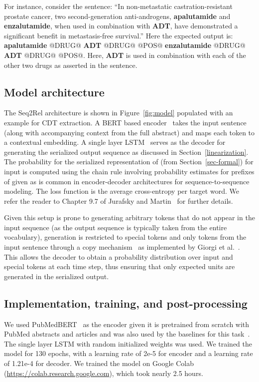 \documentclass[conference]{IEEEtran}
\begin{document}
For instance, consider the sentence: ``In non-metastatic castration-resistant prostate cancer, 
two second-generation anti-androgens, {\textbf{apalutamide} } and {\textbf{enzalutamide}}, when  
used in combination with {\textbf{ADT}}, have demonstrated a significant benefit in 
metastasis-free survival.'' Here the expected output is: {\textbf{apalutamide}} @DRUG@ {\textbf{ADT}} @DRUG@  @POS@ {\textbf{enzalutamide}} @DRUG@ 
{\textbf{ADT}} @DRUG@  @POS@. Here, \textbf{ADT} is used in combination with each of the other two drugs as asserted in the sentence. 



\subsection{Model architecture}
The Seq2Rel architecture is shown in  Figure~\ref{fig:model} populated with an example for CDT extraction. A BERT based encoder~\cite{devlin-etal-2019-bert} takes the input sentence (along with accompanying context from the full abstract) and maps each token to a contextual embedding. A single layer LSTM~\cite{HochSchm97} serves as the decoder for generating the serialized output sequence as discussed in Section~\ref{linearization}. The probability  for the serialized representation  of  (from Section~\ref{sec-formal}) for input  is computed using the chain rule involving probability estimates for prefixes of  given  as is common in encoder-decoder architectures for sequence-to-sequence modeling. The loss function is the average cross-entropy per target word. We refer the reader to Chapter 9.7 of Jurafsky and Martin~\cite{slpbook3} for further details.

Given this setup is prone to generating arbitrary tokens that do not appear in the input sequence (as the output sequence is typically taken from the entire vocabulary), generation is restricted to special tokens and only tokens from the input sentence through a copy mechanism~\cite{zeng-etal-2018-extracting} as  implemented by Giorgi et al.~\cite{giorgi-etal-2022-sequence}. This allows the decoder to obtain a probability distribution over input and special tokens at each time step, thus ensuring that only expected units are generated in the serialized output.


\subsection{Implementation, training, and post-processing}
\label{sec-post}
We used PubMedBERT~\cite{gu2021domain} as the encoder given it is pretrained from scratch with PubMed abstracts and articles and was also used by the baselines for this task~\cite{giorgi-etal-2022-sequence}. The single layer LSTM with random initialized weights was used. We trained the model for 130 epochs, with a learning rate of 2e-5 for encoder and a learning rate of 1.21e-4 for decoder. We trained the model on Google Colab (\url{https://colab.research.google.com}), which took nearly 2.5 hours.
\end{document}
